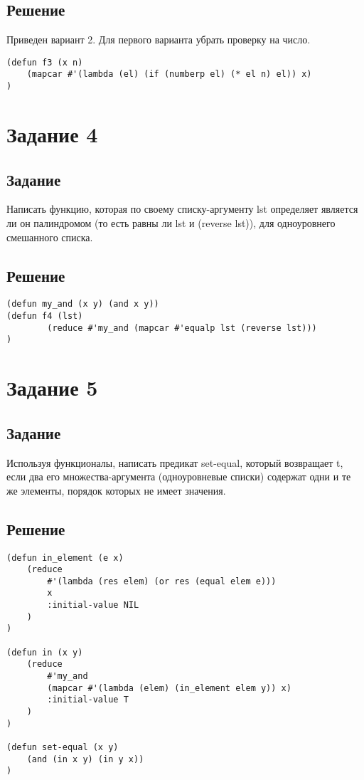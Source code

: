 \subsection*{Решение}
Приведен вариант 2. Для первого варианта убрать проверку на число.

\begin{code}
\begin{verbatim}
(defun f3 (x n)
	(mapcar #'(lambda (el) (if (numberp el) (* el n) el)) x)
)
\end{verbatim}
\end{code}

\section{Задание 4}
\subsection*{Задание}
Написать функцию, которая по своему списку-аргументу lst определяет является ли он палиндромом (то есть равны ли lst и (reverse lst)), для одноуровнего смешанного списка.

\subsection*{Решение}
\begin{code}
\begin{verbatim}
(defun my_and (x y) (and x y))
(defun f4 (lst)
        (reduce #'my_and (mapcar #'equalp lst (reverse lst)))
)
\end{verbatim}
\end{code}

\section{Задание 5}
\subsection*{Задание}
Используя функционалы, написать предикат set-equal, который возвращает t, если два его множества-аргумента (одноуровневые списки) содержат одни и те же элементы, порядок которых не имеет значения.

\subsection*{Решение}
\begin{code}
\begin{verbatim}
(defun in_element (e x)
	(reduce
		#'(lambda (res elem) (or res (equal elem e)))
		x
		:initial-value NIL
	)
)

(defun in (x y)
	(reduce
		#'my_and
		(mapcar #'(lambda (elem) (in_element elem y)) x)
		:initial-value T
	)
)

(defun set-equal (x y)
	(and (in x y) (in y x))
)
\end{verbatim}
\end{code}

